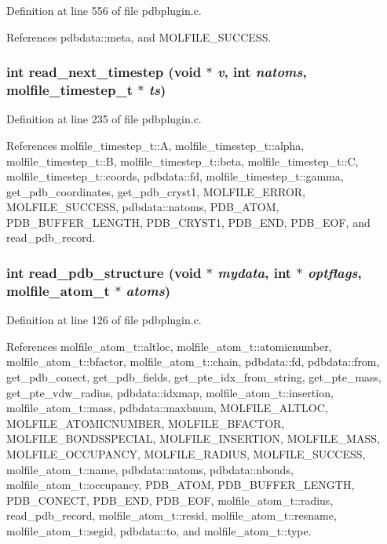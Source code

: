 Definition at line 556 of file pdbplugin.c.

References pdbdata::meta, and MOLFILE\_\-SUCCESS.
\subsubsection{\setlength{\rightskip}{0pt plus 5cm}int read\_\-next\_\-timestep (void $\ast$ {\em v}, int {\em natoms}, {\bf molfile\_\-timestep\_\-t} $\ast$ {\em ts})\hspace{0.3cm}{\tt  [static]}}\label{pdbplugin_8c_a5}




Definition at line 235 of file pdbplugin.c.

References molfile\_\-timestep\_\-t::A, molfile\_\-timestep\_\-t::alpha, molfile\_\-timestep\_\-t::B, molfile\_\-timestep\_\-t::beta, molfile\_\-timestep\_\-t::C, molfile\_\-timestep\_\-t::coords, pdbdata::fd, molfile\_\-timestep\_\-t::gamma, get\_\-pdb\_\-coordinates, get\_\-pdb\_\-cryst1, MOLFILE\_\-ERROR, MOLFILE\_\-SUCCESS, pdbdata::natoms, PDB\_\-ATOM, PDB\_\-BUFFER\_\-LENGTH, PDB\_\-CRYST1, PDB\_\-END, PDB\_\-EOF, and read\_\-pdb\_\-record.
\subsubsection{\setlength{\rightskip}{0pt plus 5cm}int read\_\-pdb\_\-structure (void $\ast$ {\em mydata}, int $\ast$ {\em optflags}, {\bf molfile\_\-atom\_\-t} $\ast$ {\em atoms})\hspace{0.3cm}{\tt  [static]}}\label{pdbplugin_8c_a3}




Definition at line 126 of file pdbplugin.c.

References molfile\_\-atom\_\-t::altloc, molfile\_\-atom\_\-t::atomicnumber, molfile\_\-atom\_\-t::bfactor, molfile\_\-atom\_\-t::chain, pdbdata::fd, pdbdata::from, get\_\-pdb\_\-conect, get\_\-pdb\_\-fields, get\_\-pte\_\-idx\_\-from\_\-string, get\_\-pte\_\-mass, get\_\-pte\_\-vdw\_\-radius, pdbdata::idxmap, molfile\_\-atom\_\-t::insertion, molfile\_\-atom\_\-t::mass, pdbdata::maxbnum, MOLFILE\_\-ALTLOC, MOLFILE\_\-ATOMICNUMBER, MOLFILE\_\-BFACTOR, MOLFILE\_\-BONDSSPECIAL, MOLFILE\_\-INSERTION, MOLFILE\_\-MASS, MOLFILE\_\-OCCUPANCY, MOLFILE\_\-RADIUS, MOLFILE\_\-SUCCESS, molfile\_\-atom\_\-t::name, pdbdata::natoms, pdbdata::nbonds, molfile\_\-atom\_\-t::occupancy, PDB\_\-ATOM, PDB\_\-BUFFER\_\-LENGTH, PDB\_\-CONECT, PDB\_\-END, PDB\_\-EOF, molfile\_\-atom\_\-t::radius, read\_\-pdb\_\-record, molfile\_\-atom\_\-t::resid, molfile\_\-atom\_\-t::resname, molfile\_\-atom\_\-t::segid, pdbdata::to, and molfile\_\-atom\_\-t::type.

